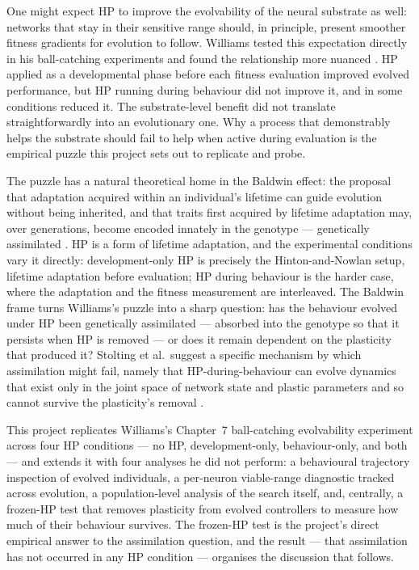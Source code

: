 One might expect HP to improve the evolvability of the neural substrate as
well: networks that stay in their sensitive range should, in principle, present
smoother fitness gradients for evolution to follow. Williams tested this
expectation directly in his ball-catching experiments and found the relationship
more nuanced \parencite{williams2006}. HP applied as a developmental phase before
each fitness evaluation improved evolved performance, but HP running during
behaviour did not improve it, and in some conditions reduced it. The
substrate-level benefit did not translate straightforwardly into an evolutionary
one. Why a process that demonstrably helps the substrate should fail to help
when active during evaluation is the empirical puzzle this project sets out to
replicate and probe.

The puzzle has a natural theoretical home in the Baldwin effect: the proposal
that adaptation acquired within an individual's lifetime can guide evolution
without being inherited, and that traits first acquired by lifetime adaptation
may, over generations, become encoded innately in the genotype --- genetically
assimilated \parencite{baldwin1896, hintonnowlan1987, mayley1996}. HP is a form
of lifetime adaptation, and the experimental conditions vary it directly:
development-only HP is precisely the Hinton-and-Nowlan setup, lifetime
adaptation before evaluation; HP during behaviour is the harder case, where the
adaptation and the fitness measurement are interleaved. The Baldwin frame turns
Williams's puzzle into a sharp question: has the behaviour evolved under HP been
genetically assimilated --- absorbed into the genotype so that it persists when
HP is removed --- or does it remain dependent on the plasticity that produced
it? Stolting et al.\ suggest a specific mechanism by which assimilation might
fail, namely that HP-during-behaviour can evolve dynamics that exist only in the
joint space of network state and plastic parameters and so cannot survive the
plasticity's removal \parencite{stolting2023}.

This project replicates Williams's Chapter~7 ball-catching evolvability
experiment across four HP conditions --- no HP, development-only, behaviour-only,
and both --- and extends it with four analyses he did not perform: a behavioural
trajectory inspection of evolved individuals, a per-neuron viable-range
diagnostic tracked across evolution, a population-level analysis of the search
itself, and, centrally, a frozen-HP test that removes plasticity from evolved
controllers to measure how much of their behaviour survives. The frozen-HP test
is the project's direct empirical answer to the assimilation question, and the
result --- that assimilation has not occurred in any HP condition --- organises
the discussion that follows.
